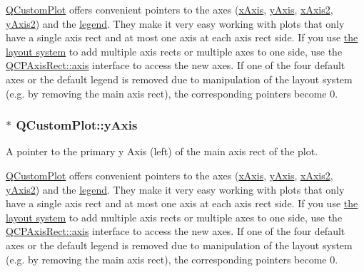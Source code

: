 \hyperlink{class_q_custom_plot}{Q\+Custom\+Plot} offers convenient pointers to the axes (\hyperlink{class_q_custom_plot_a9a79cd0158a4c7f30cbc702f0fd800e4}{x\+Axis}, \hyperlink{class_q_custom_plot_af6fea5679725b152c14facd920b19367}{y\+Axis}, \hyperlink{class_q_custom_plot_ada41599f22cad901c030f3dcbdd82fd9}{x\+Axis2}, \hyperlink{class_q_custom_plot_af13fdc5bce7d0fabd640f13ba805c0b7}{y\+Axis2}) and the \hyperlink{class_q_custom_plot_a4eadcd237dc6a09938b68b16877fa6af}{legend}. They make it very easy working with plots that only have a single axis rect and at most one axis at each axis rect side. If you use \hyperlink{}{the layout system} to add multiple axis rects or multiple axes to one side, use the \hyperlink{class_q_c_p_axis_rect_a560de44e47a4af0f86c59102a094b1e4}{Q\+C\+P\+Axis\+Rect\+::axis} interface to access the new axes. If one of the four default axes or the default legend is removed due to manipulation of the layout system (e.\+g. by removing the main axis rect), the corresponding pointers become 0. 
\subsubsection[{\texorpdfstring{y\+Axis}{yAxis}}]{ $\ast$ Q\+Custom\+Plot\+::y\+Axis}\hypertarget{class_q_custom_plot_af6fea5679725b152c14facd920b19367}{}\label{class_q_custom_plot_af6fea5679725b152c14facd920b19367}
A pointer to the primary y Axis (left) of the main axis rect of the plot.

\hyperlink{class_q_custom_plot}{Q\+Custom\+Plot} offers convenient pointers to the axes (\hyperlink{class_q_custom_plot_a9a79cd0158a4c7f30cbc702f0fd800e4}{x\+Axis}, \hyperlink{class_q_custom_plot_af6fea5679725b152c14facd920b19367}{y\+Axis}, \hyperlink{class_q_custom_plot_ada41599f22cad901c030f3dcbdd82fd9}{x\+Axis2}, \hyperlink{class_q_custom_plot_af13fdc5bce7d0fabd640f13ba805c0b7}{y\+Axis2}) and the \hyperlink{class_q_custom_plot_a4eadcd237dc6a09938b68b16877fa6af}{legend}. They make it very easy working with plots that only have a single axis rect and at most one axis at each axis rect side. If you use \hyperlink{}{the layout system} to add multiple axis rects or multiple axes to one side, use the \hyperlink{class_q_c_p_axis_rect_a560de44e47a4af0f86c59102a094b1e4}{Q\+C\+P\+Axis\+Rect\+::axis} interface to access the new axes. If one of the four default axes or the default legend is removed due to manipulation of the layout system (e.\+g. by removing the main axis rect), the corresponding pointers become 0. 
